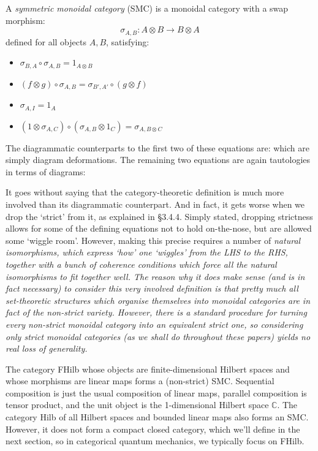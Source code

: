 \documentclass[12pt]{article}
\begin{document}
\begin{definition}
  A \textit{symmetric monoidal category} (SMC) is a monoidal category with a swap morphism:
  \[
  \sigma_{A,B} : A\otimes B \to B \otimes A
  \]
  defined for all objects $A, B$, satisfying:  
  \begin{itemize}
    \item $\sigma_{B,A} \circ \sigma_{A,B} = 1_{A\otimes B}$ 
    \item $(f \otimes g) \circ \sigma_{A,B} = \sigma_{B',A'} \circ (g \otimes f)$
    \item $\sigma_{A,I} = 1_A$
    \item $(1 \otimes \sigma_{A,C}) \circ (\sigma_{A,B} \otimes 1_C) = \sigma_{A,B\otimes C}$ 
  \end{itemize}
\end{definition} 

The diagrammatic counterparts to the first two of these equations are:
which are simply diagram deformations. The remaining two equations are again tautologies in terms of diagrams:
  
It goes without saying that the category-theoretic definition is much more involved than its diagrammatic counterpart.  And in fact, it gets worse when we drop the `strict' from it, as explained in \cite{CatsII} \S  3.4.4. Simply stated, dropping strictness allows for some of the defining equations not to hold on-the-nose,  but are allowed some `wiggle room'. However, making this precise requires a number of \em natural isomorphisms\em, which express `how' one  `wiggles' from the LHS to the RHS, together with a bunch of \em coherence conditions \em which force all the natural isomorphisms to fit together well. The reason why it does make sense (and is in fact necessary) to consider this very involved definition is that  pretty much all set-theoretic structures which organise themselves into monoidal categories are in fact of the non-strict variety.  However, there is a standard procedure for turning every non-strict monoidal category into an equivalent strict one, so considering only strict monoidal categories (as we shall do throughout these papers) yields no real loss of generality.

\begin{example}
The category FHilb whose objects are finite-dimensional Hilbert spaces and whose morphisms are linear maps forms a (non-strict) SMC. Sequential composition is just the usual composition of linear maps, parallel composition is tensor product, and the unit object is the 1-dimensional Hilbert space $\mathbb C$.   The category Hilb of all Hilbert spaces and bounded linear maps also forms an SMC. However,  it does not form a compact closed category, which we'll define in the next section, so in categorical quantum mechanics, we typically focus on FHilb.
\end{example}
\end{document}
